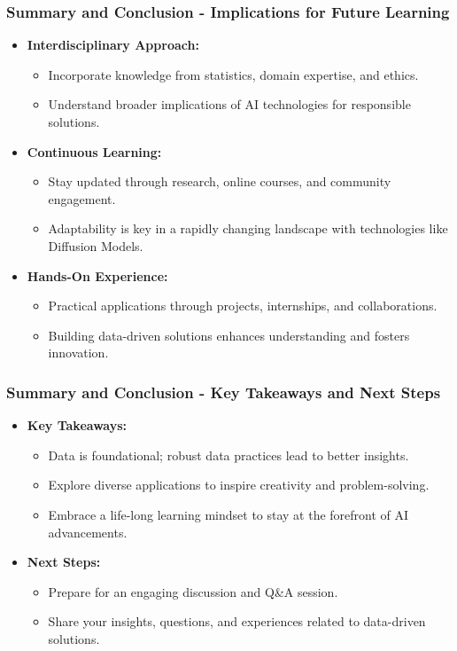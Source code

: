 \documentclass[aspectratio=169]{beamer}
\begin{document}
\begin{frame}[fragile]
    \frametitle{Summary and Conclusion - Implications for Future Learning}
    \begin{itemize}
        \item \textbf{Interdisciplinary Approach:}
        \begin{itemize}
            \item Incorporate knowledge from statistics, domain expertise, and ethics.
            \item Understand broader implications of AI technologies for responsible solutions.
        \end{itemize}

        \item \textbf{Continuous Learning:}
        \begin{itemize}
            \item Stay updated through research, online courses, and community engagement.
            \item Adaptability is key in a rapidly changing landscape with technologies like Diffusion Models.
        \end{itemize}

        \item \textbf{Hands-On Experience:}
        \begin{itemize}
            \item Practical applications through projects, internships, and collaborations.
            \item Building data-driven solutions enhances understanding and fosters innovation.
        \end{itemize}
    \end{itemize}
\end{frame}

\begin{frame}[fragile]
    \frametitle{Summary and Conclusion - Key Takeaways and Next Steps}
    \begin{itemize}
        \item \textbf{Key Takeaways:}
        \begin{itemize}
            \item Data is foundational; robust data practices lead to better insights.
            \item Explore diverse applications to inspire creativity and problem-solving.
            \item Embrace a life-long learning mindset to stay at the forefront of AI advancements.
        \end{itemize}

        \item \textbf{Next Steps:}
        \begin{itemize}
            \item Prepare for an engaging discussion and Q\&A session.
            \item Share your insights, questions, and experiences related to data-driven solutions.
        \end{itemize}
    \end{itemize}
\end{frame}
\end{document}
